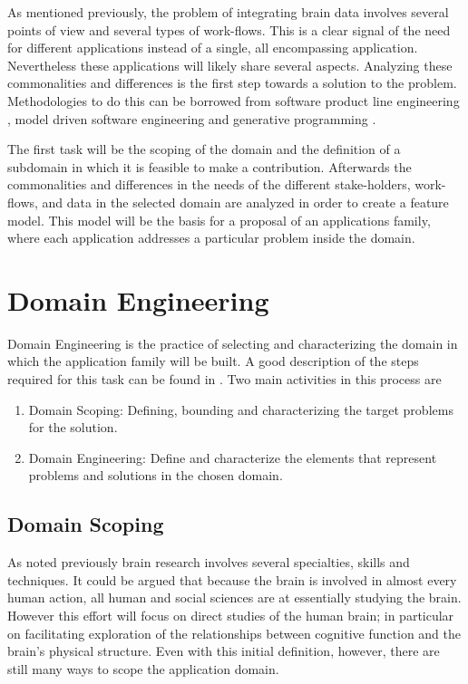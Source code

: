 As mentioned previously, the problem of integrating brain data involves several points of view and several types of work-flows. This is a clear signal of the need for different applications instead of a single, all encompassing application. Nevertheless these applications will likely share several aspects. Analyzing these commonalities and differences is the first step towards a solution to the problem. 
Methodologies to do this can be borrowed from software product line engineering \autocite{pohl_software_2005}, model driven software engineering \autocite{brambilla_model-driven_2012} and generative programming \autocite{czarnecki_generative_2000}. 

The first task will be the scoping of the domain and the definition of a subdomain in which it is feasible to make a contribution. Afterwards the commonalities and differences in the needs of the different stake-holders, work-flows, and data in the selected domain are analyzed in order to create a feature model. This model will be the basis for a proposal of an applications family, where each application addresses a particular problem inside the domain. 


\section{Domain Engineering}

Domain Engineering is the practice of selecting and characterizing the domain in which the application family will be built. A good description of the steps required for this task can be found in \autocite{czarnecki_generative_2000}. Two main activities in this process are 

\begin{enumerate}
	\item Domain Scoping: Defining, bounding and characterizing the target problems for the solution.
	\item Domain Engineering: Define and characterize the elements that represent problems and solutions in the chosen domain.
\end{enumerate}

\subsection{Domain Scoping}

As noted previously brain research involves several specialties, skills and techniques. It could be argued that because the brain is involved in almost every human action, all human and social sciences are at essentially studying the brain. However this effort will focus on direct studies of the human brain; in particular on facilitating exploration of the relationships between cognitive function and the brain's physical structure. Even with this initial definition, however, there are still many ways to scope the application domain.

